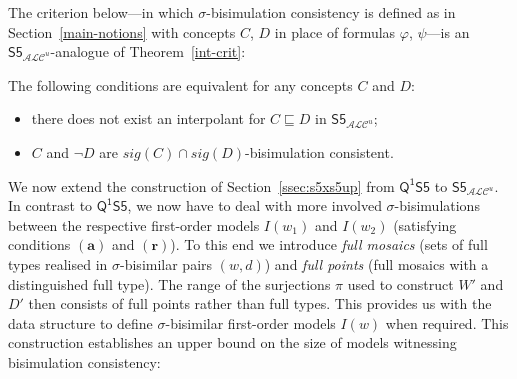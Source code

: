 \documentclass{lmcs} %
\theoremstyle{plain}\newtheorem{satz}[thm]{Satz} %
\newcommand{\sig}{\mathit{sig}}
\newcommand{\FOMS}{\ensuremath{\mathsf{Q^1S5}}}
\newcommand{\ALCIOS}{\ensuremath{\mathsf{S5}_{\mathcal{ALC}^u}}}
\begin{document}
The criterion below---in which $\sigma$-bisimulation consistency is defined as in Section~\ref{main-notions} with concepts $C$, $D$ in place of formulas $\varphi$, $\psi$---is an $\ALCIOS$-analogue of Theorem~\ref{int-crit}:

\begin{thm}\label{int-critdl}
	The following conditions are equivalent for any concepts $C$ and $D$\textup{:}
	\begin{itemize}
		\item[--] there does not exist an interpolant for $C \sqsubseteq D$ in $\ALCIOS$\textup{;}
		
		\item[--] $C$ and $\neg D$ are $\sig(C) \cap \sig(D)$-bisimulation consistent.
	\end{itemize}
\end{thm}

We now extend the construction of Section~\ref{ssec:s5xs5up} from $\FOMS$ to $\ALCIOS$. In contrast to $\FOMS$, we now have to deal with more involved $\sigma$-bisimulations between the respective first-order models $I(w_{1})$ and $I(w_{2})$ (satisfying conditions $(\mathbf{a})$ and $(\mathbf{r})$). To this end we introduce \emph{full mosaics} (sets of full types realised in $\sigma$-bisimilar pairs $(w,d)$) and \emph{full points} (full mosaics with a distinguished full type). The range of the surjections $\pi$ used to construct $W'$ and $D'$ then consists of full points rather than full types. This provides us with the data structure to define $\sigma$-bisimilar first-order models $I(w)$ when required. This construction establishes an upper bound on the size of models witnessing bisimulation consistency:
\end{document}
